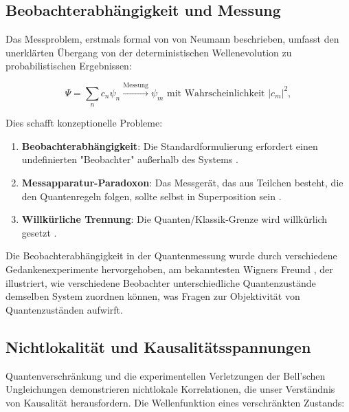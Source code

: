 \documentclass[12pt,a4paper]{article}
\begin{document}
	\subsection{Beobachterabhängigkeit und Messung}
	\label{subsec:observer_dependence}
	
	Das Messproblem, erstmals formal von von Neumann \cite{vonNeumann1932} beschrieben, umfasst den unerklärten Übergang von der deterministischen Wellenevolution zu probabilistischen Ergebnissen:
	
	\begin{equation}
		\Psi = \sum_n c_n \psi_n \xrightarrow{\text{Messung}} \psi_m \text{ mit Wahrscheinlichkeit } |c_m|^2,
		\label{eq:collapse}
	\end{equation}
	
	Dies schafft konzeptionelle Probleme:
	
	\begin{enumerate}
		\item \textbf{Beobachterabhängigkeit}: Die Standardformulierung erfordert einen undefinierten "Beobachter" außerhalb des Systems \cite{Wheeler1983, Wigner1967}.
		
		\item \textbf{Messapparatur-Paradoxon}: Das Messgerät, das aus Teilchen besteht, die den Quantenregeln folgen, sollte selbst in Superposition sein \cite{vonNeumann1932, Wigner1963}.
		
		\item \textbf{Willkürliche Trennung}: Die Quanten/Klassik-Grenze wird willkürlich gesetzt \cite{deBroglie1930, Bohm1952, Bell1987}.
	\end{enumerate}
	
	Die Beobachterabhängigkeit in der Quantenmessung wurde durch verschiedene Gedankenexperimente hervorgehoben, am bekanntesten Wigners Freund \cite{Wigner1967}, der illustriert, wie verschiedene Beobachter unterschiedliche Quantenzustände demselben System zuordnen können, was Fragen zur Objektivität von Quantenzuständen aufwirft.
	
	\subsection{Nichtlokalität und Kausalitätsspannungen}
	\label{subsec:nonlocality}
	
	Quantenverschränkung und die experimentellen Verletzungen der Bell'schen Ungleichungen \cite{Bell1964, Aspect1982, Hensen2015} demonstrieren nichtlokale Korrelationen, die unser Verständnis von Kausalität herausfordern. Die Wellenfunktion eines verschränkten Zustands:
	
\end{document}
